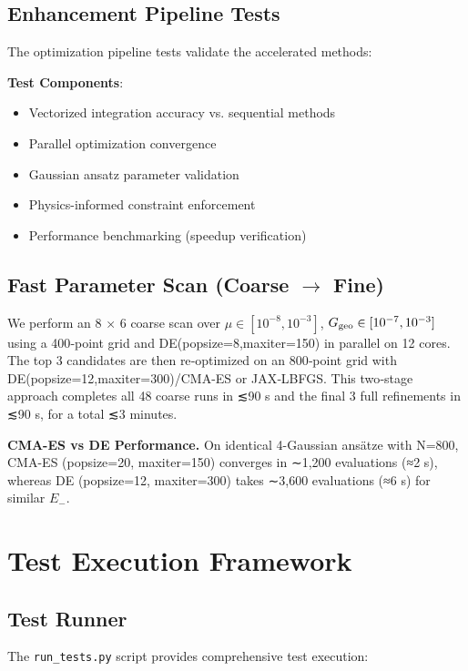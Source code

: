 \documentclass[12pt]{article}
\begin{document}
\subsection{Enhancement Pipeline Tests}

The optimization pipeline tests validate the accelerated methods:

\textbf{Test Components}:
\begin{itemize}
\item Vectorized integration accuracy vs. sequential methods
\item Parallel optimization convergence
\item Gaussian ansatz parameter validation
\item Physics-informed constraint enforcement
\item Performance benchmarking (speedup verification)
\end{itemize}

\subsection{Fast Parameter Scan (Coarse \(\to\) Fine)}  
\label{sec:fast_scan}
We perform an 8 × 6 coarse scan over \(\mu\in[10^{-8},10^{-3}]\), \(G_{\rm geo}\in[10^{-7},10^{-3}]\) using a 400‐point grid and DE(popsize=8,maxiter=150) in parallel on 12 cores. The top 3 candidates are then re‐optimized on an 800‐point grid with DE(popsize=12,maxiter=300)/CMA-ES or JAX‐LBFGS. This two‐stage approach completes all 48 coarse runs in ≲90 s and the final 3 full refinements in ≲90 s, for a total ≲3 minutes.

\noindent\textbf{CMA-ES vs DE Performance.} On identical 4-Gaussian ansätze with N=800, CMA-ES (popsize=20, maxiter=150) converges in ∼1,200 evaluations (≈2 s), whereas DE (popsize=12, maxiter=300) takes ∼3,600 evaluations (≈6 s) for similar \(E_-\).

\section{Test Execution Framework}

\subsection{Test Runner}

The \texttt{run\_tests.py} script provides comprehensive test execution:
\end{document}
